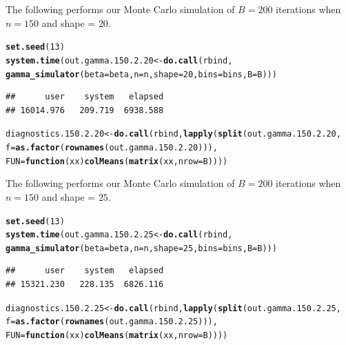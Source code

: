 \documentclass[11pt]{article}\usepackage[]{graphicx}\usepackage[]{color}
\makeatletter
\newcommand{\hlnum}[1]{\textcolor[rgb]{0.686,0.059,0.569}{#1}}%
\newcommand{\hlstd}[1]{\textcolor[rgb]{0.345,0.345,0.345}{#1}}%
\newcommand{\hlkwa}[1]{\textcolor[rgb]{0.161,0.373,0.58}{\textbf{#1}}}%
\newcommand{\hlkwb}[1]{\textcolor[rgb]{0.69,0.353,0.396}{#1}}%
\newcommand{\hlkwc}[1]{\textcolor[rgb]{0.333,0.667,0.333}{#1}}%
\newcommand{\hlkwd}[1]{\textcolor[rgb]{0.737,0.353,0.396}{\textbf{#1}}}%
\newenvironment{kframe}{%
 \def\at@end@of@kframe{}%
 \ifinner\ifhmode%
  \def\at@end@of@kframe{\end{minipage}}%
  \begin{minipage}{\columnwidth}%
 \fi\fi%
 \def\FrameCommand##1{\hskip\@totalleftmargin \hskip-\fboxsep
 \colorbox{shadecolor}{##1}\hskip-\fboxsep
     \hskip-\linewidth \hskip-\@totalleftmargin \hskip\columnwidth}%
 \MakeFramed {\advance\hsize-\width
   \@totalleftmargin\z@ \linewidth\hsize
   \@setminipage}}%
 {\par\unskip\endMakeFramed%
 \at@end@of@kframe}
\newenvironment{knitrout}{}{} %
\makeatother
\begin{document}
The following performs our Monte Carlo simulation of $B = 200$ iterations 
when $n = 150$ and shape = $20$.

\begin{knitrout}
\color{fgcolor}\begin{kframe}
\begin{alltt}
\hlkwd{set.seed}\hlstd{(}\hlnum{13}\hlstd{)}
\hlkwd{system.time}\hlstd{(out.gamma.150.2.20} \hlkwb{<-} \hlkwd{do.call}\hlstd{(rbind,}
  \hlkwd{gamma_simulator}\hlstd{(}\hlkwc{beta} \hlstd{= beta,} \hlkwc{n} \hlstd{= n,} \hlkwc{shape} \hlstd{=} \hlnum{20}\hlstd{,} \hlkwc{bins} \hlstd{= bins,} \hlkwc{B} \hlstd{= B)))}
\end{alltt}
\begin{verbatim}
##      user    system   elapsed 
## 16014.976   209.719  6938.588
\end{verbatim}
\begin{alltt}
\hlstd{diagnostics.150.2.20} \hlkwb{<-} \hlkwd{do.call}\hlstd{(rbind,} \hlkwd{lapply}\hlstd{(}\hlkwd{split}\hlstd{(out.gamma.150.2.20,}
  \hlkwc{f} \hlstd{=} \hlkwd{as.factor}\hlstd{(}\hlkwd{rownames}\hlstd{(out.gamma.150.2.20))),}
  \hlkwc{FUN} \hlstd{=} \hlkwa{function}\hlstd{(}\hlkwc{xx}\hlstd{)} \hlkwd{colMeans}\hlstd{(}\hlkwd{matrix}\hlstd{(xx,} \hlkwc{nrow} \hlstd{= B))))}
\end{alltt}
\end{kframe}
\end{knitrout}




The following performs our Monte Carlo simulation of $B = 200$ iterations 
when $n = 150$ and shape = $25$.

\begin{knitrout}
\color{fgcolor}\begin{kframe}
\begin{alltt}
\hlkwd{set.seed}\hlstd{(}\hlnum{13}\hlstd{)}
\hlkwd{system.time}\hlstd{(out.gamma.150.2.25} \hlkwb{<-} \hlkwd{do.call}\hlstd{(rbind,}
  \hlkwd{gamma_simulator}\hlstd{(}\hlkwc{beta} \hlstd{= beta,} \hlkwc{n} \hlstd{= n,} \hlkwc{shape} \hlstd{=} \hlnum{25}\hlstd{,} \hlkwc{bins} \hlstd{= bins,} \hlkwc{B} \hlstd{= B)))}
\end{alltt}
\begin{verbatim}
##      user    system   elapsed 
## 15321.230   228.135  6826.116
\end{verbatim}
\begin{alltt}
\hlstd{diagnostics.150.2.25} \hlkwb{<-} \hlkwd{do.call}\hlstd{(rbind,} \hlkwd{lapply}\hlstd{(}\hlkwd{split}\hlstd{(out.gamma.150.2.25,}
  \hlkwc{f} \hlstd{=} \hlkwd{as.factor}\hlstd{(}\hlkwd{rownames}\hlstd{(out.gamma.150.2.25))),}
  \hlkwc{FUN} \hlstd{=} \hlkwa{function}\hlstd{(}\hlkwc{xx}\hlstd{)} \hlkwd{colMeans}\hlstd{(}\hlkwd{matrix}\hlstd{(xx,} \hlkwc{nrow} \hlstd{= B))))}
\end{alltt}
\end{kframe}
\end{knitrout}
\end{document}
